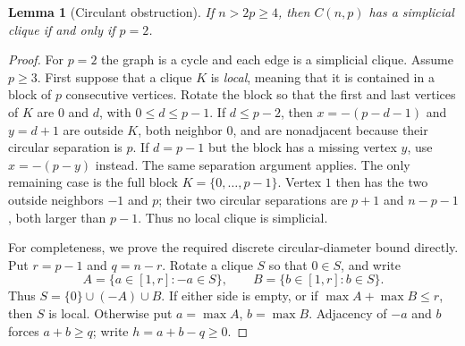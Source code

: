 \documentclass[11pt,a4paper]{article}
\newtheorem{lemma}[theorem]{Lemma}
\theoremstyle{remark}
\begin{document}
\begin{lemma}[Circulant obstruction]\label{lem:circulant-obstruction}
If $n>2p\geq4$, then $C(n,p)$ has a simplicial clique if and only if $p=2$.
\end{lemma}

\begin{proof}
For $p=2$ the graph is a cycle and each edge is a simplicial clique. Assume
$p\geq3$. First suppose that a clique $K$ is \emph{local}, meaning that it
is contained in a block of $p$ consecutive vertices. Rotate the block so
that the first and last vertices of $K$ are $0$ and $d$, with
$0\leq d\leq p-1$. If $d\leq p-2$, then
$x=-(p-d-1)$ and $y=d+1$ are outside $K$, both neighbor $0$, and are
nonadjacent because their circular separation is $p$. If $d=p-1$ but the
block has a missing vertex $y$, use $x=-(p-y)$ instead. The same separation
argument applies. The only remaining case is the full block
$K=\{0,\ldots,p-1\}$. Vertex $1$ then has the two outside neighbors $-1$
and $p$; their two circular separations are $p+1$ and $n-p-1$, both larger
than $p-1$. Thus no local clique is simplicial.

For completeness, we prove the required discrete circular-diameter bound
directly. Put $r=p-1$ and $q=n-r$. Rotate a clique $S$ so that $0\in S$, and
write
\[
 A=\{a\in[1,r]:-a\in S\},\qquad
 B=\{b\in[1,r]:b\in S\}.
\]
Thus $S=\{0\}\cup(-A)\cup B$. If either side is empty, or if
$\max A+\max B\leq r$, then $S$ is local. Otherwise put
$a=\max A$, $b=\max B$. Adjacency of $-a$ and $b$ forces
$a+b\geq q$; write $h=a+b-q\geq0$.


\end{proof}
\end{document}
